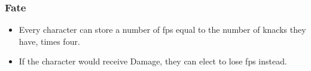 \subsubsection*{Fate}
\begin{itemize}
  \item
  Every character can store a number of \glspl{fp} equal to the number of knacks they have, times four.
  \item
  If the character would receive Damage, they can elect to lose \glspl{fp} instead.
\end{itemize}
